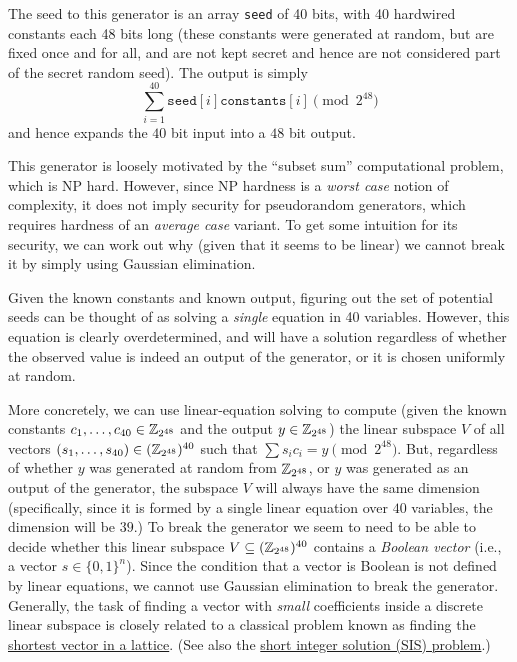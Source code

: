 The seed to this generator is an array \texttt{seed} of 40 bits, with 40
hardwired constants each 48 bits long (these constants were generated at
random, but are fixed once and for all, and are not kept secret and
hence are not considered part of the secret random seed). The output is
simply
\[\sum_{i=1}^{40} \texttt{seed}[i]\texttt{constants}[i] \pmod{2^{48}}\]
and hence expands the \(40\) bit input into a \(48\) bit output.

This generator is loosely motivated by the ``subset sum'' computational
problem, which is NP hard. However, since NP hardness is a \emph{worst
case} notion of complexity, it does not imply security for pseudorandom
generators, which requires hardness of an \emph{average case} variant.
To get some intuition for its security, we can work out why (given that
it seems to be linear) we cannot break it by simply using Gaussian
elimination.


Given the known constants and known output, figuring out the set of
potential seeds can be thought of as solving a \emph{single} equation in
40 variables. However, this equation is clearly overdetermined, and will
have a solution regardless of whether the observed value is indeed an
output of the generator, or it is chosen uniformly at random.

More concretely, we can use linear-equation solving to compute (given
the known constants \(c_1,\ldots,c_{40} \in {\mathbb{Z}}_{2^{48}}\) and the output
\(y \in {\mathbb{Z}}_{2^{48}}\)) the linear subspace \(V\) of all vectors
\((s_1,\ldots,s_{40}) \in ({\mathbb{Z}}_{2^{48}})^{40}\) such that
\(\sum s_i c_i = y \pmod{2^{48}}\). But, regardless of whether \(y\) was
generated at random from \({\mathbb{Z}}_{2^{48}}\), or \(y\) was generated as an
output of the generator, the subspace \(V\) will always have the same
dimension (specifically, since it is formed by a single linear equation
over \(40\) variables, the dimension will be \(39\).) To break the
generator we seem to need to be able to decide whether this linear
subspace \(V \subseteq ({\mathbb{Z}}_{2^{48}})^{40}\) contains a \emph{Boolean
vector} (i.e., a vector \(s\in \{0,1\}^n\)). Since the condition that a
vector is Boolean is not defined by linear equations, we cannot use
Gaussian elimination to break the generator. Generally, the task of
finding a vector with \emph{small} coefficients inside a discrete linear
subspace is closely related to a classical problem known as finding the
\href{https://goo.gl/WRNT9S}{shortest vector in a lattice}. (See also
the \href{https://goo.gl/KwZWhV}{short integer solution (SIS) problem}.)

